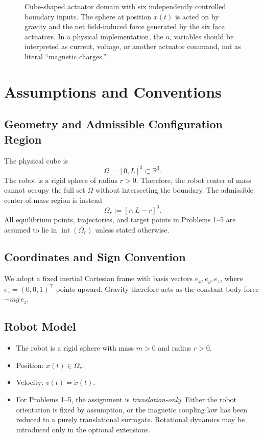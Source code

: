 \documentclass[11pt]{article}
\begin{document}
\begin{figure}[t]
\caption{Cube-shaped actuator domain with six independently controlled boundary inputs. The sphere at position $x(t)$ is acted on by gravity and the net field-induced force generated by the six face actuators. In a physical implementation, the $u_{\cdot}$ variables should be interpreted as current, voltage, or another actuator command, not as literal ``magnetic charges.''}
\label{fig:cube_setup}
\end{figure}

\section{Assumptions and Conventions}

\subsection{Geometry and Admissible Configuration Region}
The physical cube is
\[
\Omega = [0,L]^3 \subset \mathbb{R}^3.
\]
The robot is a rigid sphere of radius $r>0$. Therefore, the robot center of mass cannot occupy the full set $\Omega$ without intersecting the boundary. The admissible center-of-mass region is instead
\[
\Omega_r := [r,L-r]^3.
\]
All equilibrium points, trajectories, and target points in Problems 1--5 are assumed to lie in $\operatorname{int}(\Omega_r)$ unless stated otherwise.

\subsection{Coordinates and Sign Convention}
We adopt a fixed inertial Cartesian frame with basis vectors $e_x,e_y,e_z$, where $e_z=(0,0,1)^\top$ points upward. Gravity therefore acts as the constant body force $-mg\,e_z$.

\subsection{Robot Model}
\begin{itemize}[leftmargin=1.5em]
    \item The robot is a rigid sphere with mass $m>0$ and radius $r>0$.
    \item Position: $x(t)\in\Omega_r$.
    \item Velocity: $v(t)=\dot{x}(t)$.
    \item For Problems 1--5, the assignment is \emph{translation-only}. Either the robot orientation is fixed by assumption, or the magnetic coupling law has been reduced to a purely translational surrogate. Rotational dynamics may be introduced only in the optional extensions.
\end{itemize}
\end{document}
